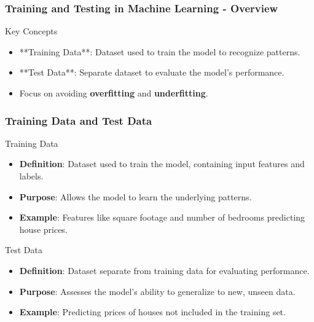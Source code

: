 \documentclass[aspectratio=169]{beamer}
\begin{document}
\begin{frame}[fragile]
    \frametitle{Training and Testing in Machine Learning - Overview}
    \begin{block}{Key Concepts}
        \begin{itemize}
            \item **Training Data**: Dataset used to train the model to recognize patterns.
            \item **Test Data**: Separate dataset to evaluate the model's performance.
            \item Focus on avoiding \textbf{overfitting} and \textbf{underfitting}.
        \end{itemize} 
    \end{block}
\end{frame}

\begin{frame}[fragile]
    \frametitle{Training Data and Test Data}
    \begin{block}{Training Data}
        \begin{itemize}
            \item \textbf{Definition}: Dataset used to train the model, containing input features and labels.
            \item \textbf{Purpose}: Allows the model to learn the underlying patterns.
            \item \textbf{Example}: Features like square footage and number of bedrooms predicting house prices.
        \end{itemize}
    \end{block}
    
    \begin{block}{Test Data}
        \begin{itemize}
            \item \textbf{Definition}: Dataset separate from training data for evaluating performance.
            \item \textbf{Purpose}: Assesses the model's ability to generalize to new, unseen data.
            \item \textbf{Example}: Predicting prices of houses not included in the training set.
        \end{itemize}
    \end{block}
\end{frame}
\end{document}
